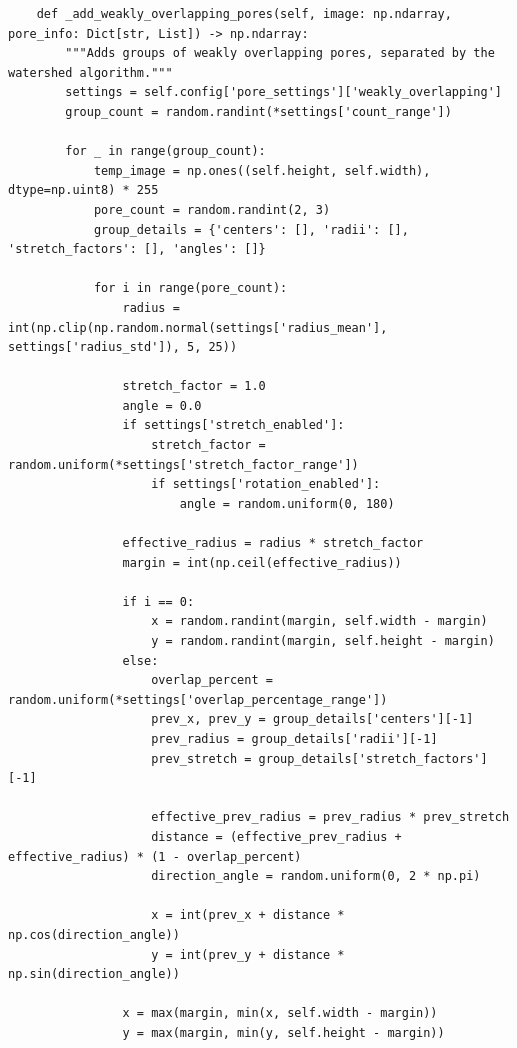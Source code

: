 \documentclass[code]{wordcore}
\begin{document}
\begin{code}
\begin{verbatim}
    def _add_weakly_overlapping_pores(self, image: np.ndarray, pore_info: Dict[str, List]) -> np.ndarray:
        """Adds groups of weakly overlapping pores, separated by the watershed algorithm."""
        settings = self.config['pore_settings']['weakly_overlapping']
        group_count = random.randint(*settings['count_range'])

        for _ in range(group_count):
            temp_image = np.ones((self.height, self.width), dtype=np.uint8) * 255
            pore_count = random.randint(2, 3)
            group_details = {'centers': [], 'radii': [], 'stretch_factors': [], 'angles': []}

            for i in range(pore_count):
                radius = int(np.clip(np.random.normal(settings['radius_mean'], settings['radius_std']), 5, 25))
                
                stretch_factor = 1.0
                angle = 0.0
                if settings['stretch_enabled']:
                    stretch_factor = random.uniform(*settings['stretch_factor_range'])
                    if settings['rotation_enabled']:
                        angle = random.uniform(0, 180)
                
                effective_radius = radius * stretch_factor
                margin = int(np.ceil(effective_radius))

                if i == 0:
                    x = random.randint(margin, self.width - margin)
                    y = random.randint(margin, self.height - margin)
                else:
                    overlap_percent = random.uniform(*settings['overlap_percentage_range'])
                    prev_x, prev_y = group_details['centers'][-1]
                    prev_radius = group_details['radii'][-1]
                    prev_stretch = group_details['stretch_factors'][-1]
                    
                    effective_prev_radius = prev_radius * prev_stretch
                    distance = (effective_prev_radius + effective_radius) * (1 - overlap_percent)
                    direction_angle = random.uniform(0, 2 * np.pi)
                    
                    x = int(prev_x + distance * np.cos(direction_angle))
                    y = int(prev_y + distance * np.sin(direction_angle))
                
                x = max(margin, min(x, self.width - margin))
                y = max(margin, min(y, self.height - margin))
                

\end{verbatim}
\end{code}
\end{document}

